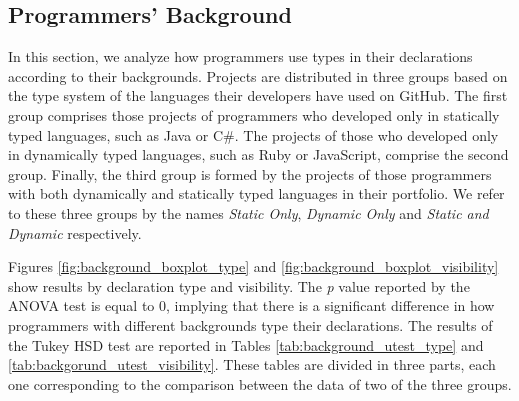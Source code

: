 \documentclass[]{sigplanconf}
\begin{document}
\subsection{Programmers' Background\label{sec:results-background}}
In this section, we analyze how programmers use types in their declarations according to their backgrounds.
Projects are distributed in three groups based on the type system of the languages their developers have used on GitHub.
The first group comprises those projects of programmers who developed only in statically typed languages, such as Java or C\#.
The projects of those who developed only in dynamically typed languages, such as Ruby or JavaScript, comprise the second group.
Finally, the third group is formed by the projects of those programmers with both dynamically and statically typed languages in their portfolio.
We refer to these three groups by the names \emph{Static Only}, \emph{Dynamic Only} and \emph{Static and Dynamic} respectively.

Figures \ref{fig:background_boxplot_type} and \ref{fig:background_boxplot_visibility}  show results by declaration type and visibility.
The \emph{p} value reported by the ANOVA test is equal to 0, implying that there is a significant difference in how programmers with different backgrounds type their declarations.
The results of the Tukey HSD test are reported in Tables \ref{tab:background_utest_type} and \ref{tab:backgorund_utest_visibility}.
These tables are divided in three parts, each one corresponding to the comparison between the data of two of the three groups.
\end{document}
